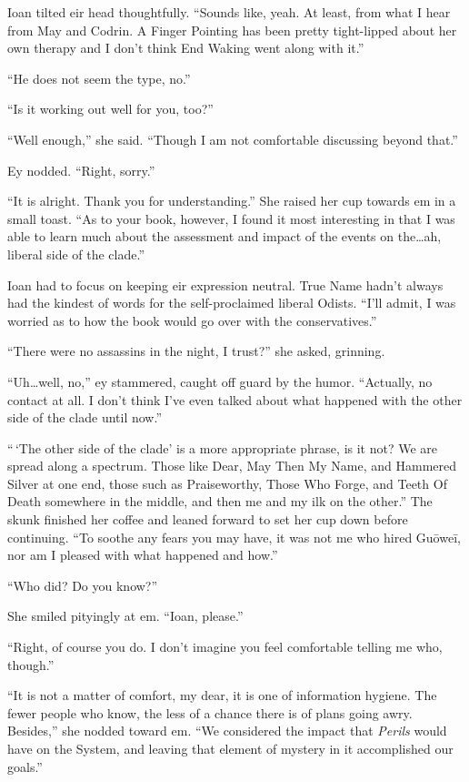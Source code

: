 Ioan tilted eir head thoughtfully. ``Sounds like, yeah. At least, from what I hear from May and Codrin. A Finger Pointing has been pretty tight-lipped about her own therapy and I don't think End Waking went along with it.''

``He does not seem the type, no.''

``Is it working out well for you, too?''

``Well enough,'' she said. ``Though I am not comfortable discussing beyond that.''

Ey nodded. ``Right, sorry.''

``It is alright. Thank you for understanding.'' She raised her cup towards em in a small toast. ``As to your book, however, I found it most interesting in that I was able to learn much about the assessment and impact of the events on the\ldots ah, liberal side of the clade.''

Ioan had to focus on keeping eir expression neutral. True Name hadn't always had the kindest of words for the self-proclaimed liberal Odists. ``I'll admit, I was worried as to how the book would go over with the conservatives.''

``There were no assassins in the night, I trust?'' she asked, grinning.

``Uh\ldots well, no,'' ey stammered, caught off guard by the humor. ``Actually, no contact at all. I don't think I've even talked about what happened with the other side of the clade until now.''

``\,`The other side of the clade' is a more appropriate phrase, is it not? We are spread along a spectrum. Those like Dear, May Then My Name, and Hammered Silver at one end, those such as Praiseworthy, Those Who Forge, and Teeth Of Death somewhere in the middle, and then me and my ilk on the other.'' The skunk finished her coffee and leaned forward to set her cup down before continuing. ``To soothe any fears you may have, it was not me who hired Guōweī, nor am I pleased with what happened and how.''

``Who did? Do you know?''

She smiled pityingly at em. ``Ioan, please.''

``Right, of course you do. I don't imagine you feel comfortable telling me who, though.''

``It is not a matter of comfort, my dear, it is one of information hygiene. The fewer people who know, the less of a chance there is of plans going awry. Besides,'' she nodded toward em. ``We considered the impact that \emph{Perils} would have on the System, and leaving that element of mystery in it accomplished our goals.''

